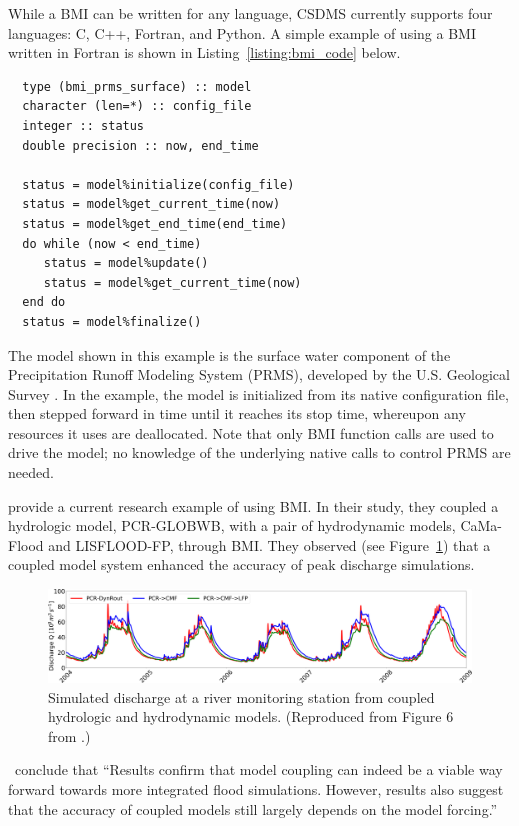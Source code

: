 \documentclass[12pt]{amsart}
\begin{document}
While a BMI can be written for any language,
CSDMS currently supports four languages: C, C++, Fortran, and Python.
A simple example of using a BMI written in Fortran
is shown in Listing~\ref{listing:bmi_code} below.
%
\begin{listing}[ht]
\begin{verbatim}
  type (bmi_prms_surface) :: model
  character (len=*) :: config_file
  integer :: status
  double precision :: now, end_time

  status = model%initialize(config_file)
  status = model%get_current_time(now)
  status = model%get_end_time(end_time)
  do while (now < end_time)
     status = model%update()
     status = model%get_current_time(now)
  end do
  status = model%finalize()
\end{verbatim}
\label{listing:bmi_code}
\end{listing}
%
The model shown in this example
is the surface water component of the Precipitation Runoff Modeling System (PRMS),
developed by the U.S. Geological Survey \citep{leavesley1984precipitation}.
In the example,
the model is initialized from its native configuration file,
then stepped forward in time until it reaches its stop time,
whereupon any resources it uses are deallocated.
Note that only BMI function calls are used to drive the model;
no knowledge of the underlying native calls to control PRMS are needed.

\cite{hoch2019evaluating} provide a current research example of using BMI. 
In their study,
they coupled a hydrologic model, PCR-GLOBWB,
with a pair of hydrodynamic models, CaMa-Flood and LISFLOOD-FP,
through BMI.
They observed (see Figure~\ref{fig:hoch_2019_fig6}) that a coupled model system
enhanced the accuracy of peak discharge simulations.
%
\begin{figure}[h!]
\centering
\includegraphics[scale=0.8]{Figures/nhess-19-1723-2019-f06.png}
\caption{Simulated discharge at a river monitoring station from coupled hydrologic and hydrodynamic models. (Reproduced from Figure 6 from \citet{hoch2019evaluating}.)}
\label{fig:hoch_2019_fig6}
\end{figure}
%
\citeauthor{hoch2019evaluating}\ conclude
that ``Results confirm that model coupling can indeed be a viable way forward towards more integrated flood simulations. However, results also suggest that the accuracy of coupled models still largely depends on the model forcing.''
\end{document}
